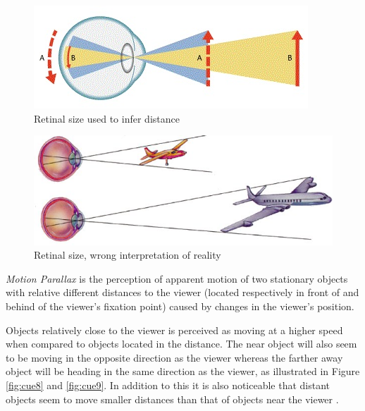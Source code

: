 \begin{figure}[h!]
   \centering
   \includegraphics[scale=0.7]{figures/cue6.jpg}
   \caption{Retinal size used to infer distance \cite{Perslides}}\label{fig:cue6}
\end{figure}

\begin{figure}[h!]
   \centering
   \includegraphics[scale=1]{figures/cue7.jpg}
   \caption{Retinal size, wrong interpretation of reality \cite{Psych}}\label{fig:cue7}
\end{figure}

\pagebreak
\textit{Motion Parallax} is the perception of apparent motion of two stationary objects with relative different distances to the viewer (located respectively in front of and behind of the viewer’s fixation point) caused by changes in the viewer’s position. 

Objects relatively close to the viewer is perceived as moving at a higher speed when compared to objects located in the distance. The near object will also seem to be moving in the opposite direction as the viewer whereas the farther away object will be heading in the same direction as the viewer, as illustrated in Figure \ref{fig:cue8} and \ref{fig:cue9}.  
In addition to this it is also noticeable that distant objects seem to move smaller distances than that of objects near the viewer \cite{Gale} \cite{Shrestha2013} \cite{Skybrary}.

